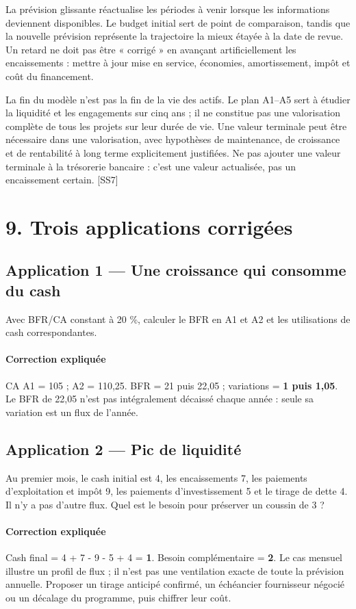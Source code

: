 \documentclass[12pt,a4paper]{article}
\begin{document}
La prévision glissante réactualise les périodes à venir lorsque les informations deviennent disponibles. Le budget initial sert de point de comparaison, tandis que la nouvelle prévision représente la trajectoire la mieux étayée à la date de revue. Un retard ne doit pas être « corrigé » en avançant artificiellement les encaissements : mettre à jour mise en service, économies, amortissement, impôt et coût du financement.


La fin du modèle n’est pas la fin de la vie des actifs. Le plan A1--A5 sert à étudier la liquidité et les engagements sur cinq ans ; il ne constitue pas une valorisation complète de tous les projets sur leur durée de vie. Une valeur terminale peut être nécessaire dans une valorisation, avec hypothèses de maintenance, de croissance et de rentabilité à long terme explicitement justifiées. Ne pas ajouter une valeur terminale à la trésorerie bancaire : c’est une valeur actualisée, pas un encaissement certain. [SS7]

\section*{9. Trois applications corrigées}

\subsection*{Application 1 --- Une croissance qui consomme du cash}
Avec BFR/CA constant à 20 \%, calculer le BFR en A1 et A2 et les utilisations de cash correspondantes.


\paragraph{Correction expliquée}
CA A1 = 105 ; A2 = 110,25. BFR = 21 puis 22,05 ; variations = \textbf{1 puis 1,05}. Le BFR de 22,05 n’est pas intégralement décaissé chaque année : seule sa variation est un flux de l’année.



\subsection*{Application 2 --- Pic de liquidité}
Au premier mois, le cash initial est 4, les encaissements 7, les paiements d’exploitation et impôt 9, les paiements d’investissement 5 et le tirage de dette 4. Il n’y a pas d’autre flux. Quel est le besoin pour préserver un coussin de 3 ?


\paragraph{Correction expliquée}
Cash final = 4 + 7 - 9 - 5 + 4 = \textbf{1}. Besoin complémentaire = \textbf{2}. Le cas mensuel illustre un profil de flux ; il n’est pas une ventilation exacte de toute la prévision annuelle. Proposer un tirage anticipé confirmé, un échéancier fournisseur négocié ou un décalage du programme, puis chiffrer leur coût.
\end{document}
